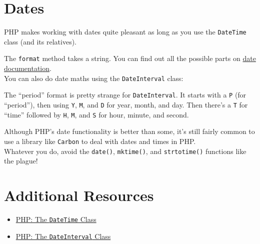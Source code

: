 \section{Dates}

PHP makes working with dates quite pleasant as long as you use the \texttt{DateTime} class (and its relatives).


The \texttt{format} method takes a string. You can find out all the possible parts on \href{http://www.php.net/manual/en/function.date.php}{date documentation}.
\\

You can also do date maths using the \texttt{DateInterval} class:


The ``period'' format is pretty strange for \texttt{DateInterval}. It starts with a \texttt{P} (for ``period''), then using \texttt{Y}, \texttt{M}, and \texttt{D} for year, month, and day. Then there's a \texttt{T} for ``time'' followed by \texttt{H}, \texttt{M}, and \texttt{S} for hour, minute, and second.

\hr

Although PHP's date functionality is better than some, it's still fairly common to use a library like \texttt{Carbon} to deal with dates and times in PHP.
\\

Whatever you do, avoid the \texttt{date()}, \texttt{mktime()}, and \texttt{strtotime()} functions like the plague!

\section{Additional Resources}

\begin{itemize}[leftmargin=*]
    \item \href{http://www.php.net/manual/en/class.datetime.php}{PHP: The \texttt{DateTime} Class}
    \item \href{http://www.php.net/manual/en/class.dateinterval.php}{PHP: The \texttt{DateInterval} Class}
\end{itemize}
